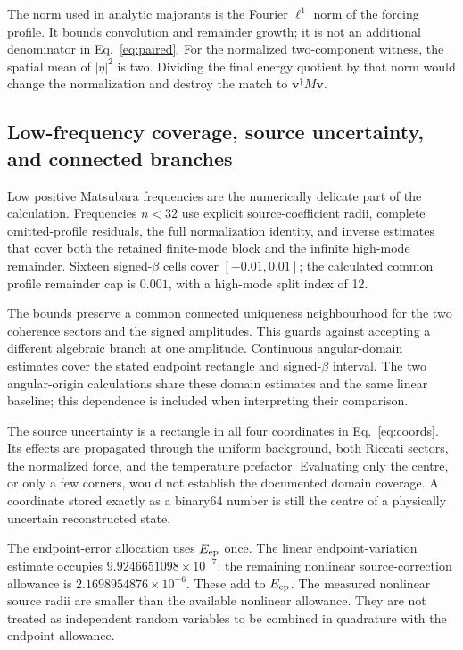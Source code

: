 The norm used in analytic majorants is the Fourier $\ell^1$ norm of the forcing profile. It bounds convolution and remainder growth; it is not an additional denominator in Eq.~\eqref{eq:paired}. For the normalized two-component witness, the spatial mean of $|\eta|^2$ is two. Dividing the final energy quotient by that norm would change the normalization and destroy the match to $\bm v^\dagger M\bm v$.

\subsection{Low-frequency coverage, source uncertainty, and connected branches}
Low positive Matsubara frequencies are the numerically delicate part of the calculation. Frequencies $n<32$ use explicit source-coefficient radii, complete omitted-profile residuals, the full normalization identity, and inverse estimates that cover both the retained finite-mode block and the infinite high-mode remainder. Sixteen signed-$\beta$ cells cover $[-0.01,0.01]$; the calculated common profile remainder cap is $0.001$, with a high-mode split index of 12.

The bounds preserve a common connected uniqueness neighbourhood for the two coherence sectors and the signed amplitudes. This guards against accepting a different algebraic branch at one amplitude. Continuous angular-domain estimates cover the stated endpoint rectangle and signed-$\beta$ interval. The two angular-origin calculations share these domain estimates and the same linear baseline; this dependence is included when interpreting their comparison.

The source uncertainty is a rectangle in all four coordinates in Eq.~\eqref{eq:coords}. Its effects are propagated through the uniform background, both Riccati sectors, the normalized force, and the temperature prefactor. Evaluating only the centre, or only a few corners, would not establish the documented domain coverage. A coordinate stored exactly as a binary64 number is still the centre of a physically uncertain reconstructed state.

The endpoint-error allocation uses $E_{\mathrm{ep}}$ once. The linear endpoint-variation estimate occupies $9.9246651098\times10^{-7}$; the remaining nonlinear source-correction allowance is $2.1698954876\times10^{-6}$. These add to $E_{\mathrm{ep}}$. The measured nonlinear source radii are smaller than the available nonlinear allowance. They are not treated as independent random variables to be combined in quadrature with the endpoint allowance.

